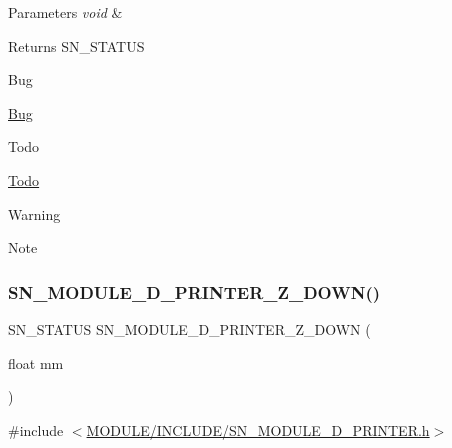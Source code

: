 \begin{DoxyParams}{Parameters}
{\em void} & \\
\hline
\end{DoxyParams}
\begin{DoxyReturn}{Returns}
S\+N\+\_\+\+S\+T\+A\+T\+US 
\end{DoxyReturn}
\begin{DoxyRefDesc}{Bug}
\item[\hyperlink{bug__bug000003}{Bug}]\end{DoxyRefDesc}
\begin{DoxyRefDesc}{Todo}
\item[\hyperlink{todo__todo000003}{Todo}]\end{DoxyRefDesc}
\begin{DoxyWarning}{Warning}

\end{DoxyWarning}
\begin{DoxyNote}{Note}

\end{DoxyNote}
\mbox{\label{group__PRINTER_ga5747a0d753cb9d79747db6f4a22b18e9}} 
\subsubsection{\texorpdfstring{S\+N\+\_\+\+M\+O\+D\+U\+L\+E\+\_\+D\+\_\+\+P\+R\+I\+N\+T\+E\+R\+\_\+\+Z\+\_\+\+D\+O\+W\+N()}{SN\_MODULE\_3D\_PRINTER\_Z\_DOWN()}}
{\footnotesize\ttfamily S\+N\+\_\+\+S\+T\+A\+T\+US S\+N\+\_\+\+M\+O\+D\+U\+L\+E\+\_\+D\+\_\+\+P\+R\+I\+N\+T\+E\+R\+\_\+\+Z\+\_\+\+D\+O\+WN (\begin{DoxyParamCaption}\item[{float}]{mm }\end{DoxyParamCaption})}



{\ttfamily \#include $<$\hyperlink{SN__MODULE__3D__PRINTER_8h}{M\+O\+D\+U\+L\+E/\+I\+N\+C\+L\+U\+D\+E/\+S\+N\+\_\+\+M\+O\+D\+U\+L\+E\+\_\+D\+\_\+\+P\+R\+I\+N\+T\+E\+R.\+h}$>$}


